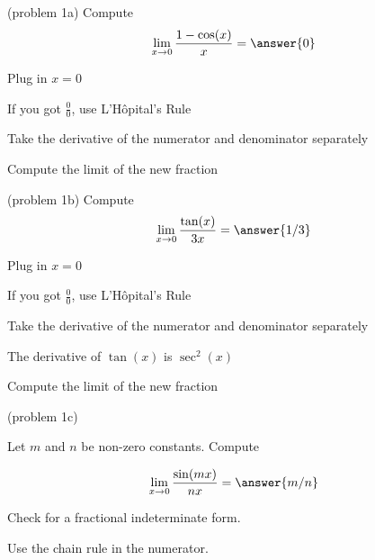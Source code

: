 \documentclass[handout]{ximera}
\begin{document}
\begin{problem}(problem 1a)
  Compute
  \[
  \lim_{x \to 0} \frac{1 - \cos(x)}{x} = \answer{0}
  \]
  
    \begin{hint}
      Plug in $x=0$
    \end{hint}
    \begin{hint}
      If you got $\frac00$, use L'H\^{o}pital's Rule
    \end{hint}
    \begin{hint}
      Take the derivative of the numerator and denominator separately
    \end{hint}
    \begin{hint}
      Compute the limit of the new fraction
    \end{hint}
    
		
	
\end{problem}



\begin{problem}(problem 1b)
  Compute
  \[
  \lim_{x \to 0} \frac{\tan(x)}{3x} = \answer{1/3}
  \]
  
    \begin{hint}
      Plug in $x=0$
    \end{hint}
    \begin{hint}
      If you got $\frac00$, use L'H\^{o}pital's Rule
    \end{hint}
    \begin{hint}
      Take the derivative of the numerator and denominator separately
    \end{hint}
		\begin{hint}
		  The derivative of $\tan(x)$ is $\sec^2(x)$
    \end{hint}
		\begin{hint}
      Compute the limit of the new fraction
    \end{hint}
	
\end{problem}





\begin{problem}(problem 1c)

Let $m$ and $n$ be non-zero constants. Compute

        \[  \lim_{x \to 0} \frac{\sin(mx)}{nx} = \answer{m/n} \]
  
   \begin{hint}   Check for a fractional indeterminate form.  \end{hint}
    
   \begin{hint}   Use the chain rule in the numerator.        \end{hint}
		
\end{problem}
\end{document}
